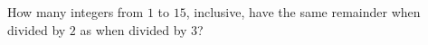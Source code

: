 How many integers from $1$ to $15$, inclusive, have the same remainder when divided by $2$ as when divided by $3$?
